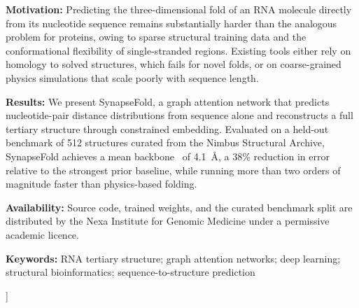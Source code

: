 \documentclass[10pt,twoside]{article}
\begin{document}
\begin{abstractbox}
\textbf{\color{oxfordblue}Motivation:} Predicting the three-dimensional fold of an RNA molecule directly from its nucleotide sequence remains substantially harder than the analogous problem for proteins, owing to sparse structural training data and the conformational flexibility of single-stranded regions. Existing tools either rely on homology to solved structures, which fails for novel folds, or on coarse-grained physics simulations that scale poorly with sequence length.

\medskip
\textbf{\color{oxfordblue}Results:} We present SynapseFold, a graph attention network that predicts nucleotide-pair distance distributions from sequence alone and reconstructs a full tertiary structure through constrained embedding. Evaluated on a held-out benchmark of 512 structures curated from the Nimbus Structural Archive, SynapseFold achieves a mean backbone \rmsd\ of 4.1~\AA, a 38\% reduction in error relative to the strongest prior baseline, while running more than two orders of magnitude faster than physics-based folding.

\medskip
\textbf{\color{oxfordblue}Availability:} Source code, trained weights, and the curated benchmark split are distributed by the Nexa Institute for Genomic Medicine under a permissive academic licence.

\medskip
\textbf{\color{oxfordblue}Keywords:} RNA tertiary structure; graph attention networks; deep learning; structural bioinformatics; sequence-to-structure prediction
\end{abstractbox}
\vspace{8pt}
]

\thispagestyle{firstpage}










\end{document}
